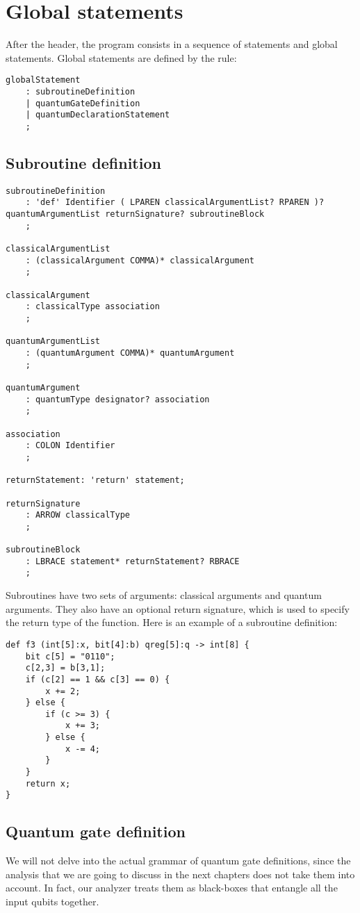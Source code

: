 \documentclass[12pt,a4paper]{report}
\theoremstyle{definition}
\theoremstyle{definition}
\theoremstyle{definition}
\begin{document}
\section{Global statements}
After the header, the program consists in a sequence of statements and global statements. Global statements are defined by the rule:
\begin{lstlisting}
globalStatement
    : subroutineDefinition
    | quantumGateDefinition
    | quantumDeclarationStatement
    ;
\end{lstlisting}



\subsection{Subroutine definition}
\begin{lstlisting}
subroutineDefinition
    : 'def' Identifier ( LPAREN classicalArgumentList? RPAREN )? quantumArgumentList returnSignature? subroutineBlock
    ;

classicalArgumentList
    : (classicalArgument COMMA)* classicalArgument
    ;

classicalArgument
    : classicalType association
    ;

quantumArgumentList
    : (quantumArgument COMMA)* quantumArgument
    ;

quantumArgument
    : quantumType designator? association
    ;

association
    : COLON Identifier
    ;

returnStatement: 'return' statement;

returnSignature
    : ARROW classicalType
    ;

subroutineBlock
    : LBRACE statement* returnStatement? RBRACE
    ;
\end{lstlisting}

Subroutines have two sets of arguments: classical arguments and quantum arguments. They also have an optional return signature, which is used to specify the return type of the function. Here is an example of a subroutine definition:
\begin{lstlisting}
def f3 (int[5]:x, bit[4]:b) qreg[5]:q -> int[8] {
    bit c[5] = "0110";
    c[2,3] = b[3,1];
    if (c[2] == 1 && c[3] == 0) {
        x += 2;
    } else {
        if (c >= 3) {
            x += 3;
        } else {
            x -= 4;
        }
    }
    return x;
}
\end{lstlisting}


\subsection{Quantum gate definition}
We will not delve into the actual grammar of quantum gate definitions, since the analysis that we are going to discuss in the next chapters does not take them into account. In fact, our analyzer treats them as black-boxes that entangle all the input qubits together.
\end{document}
